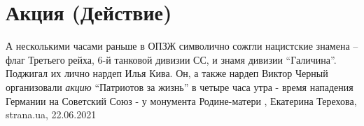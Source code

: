  
 
 
 
 
\chapter{Акция (Действие)}

А несколькими часами раньше в ОПЗЖ символично сожгли нацистские знамена – флаг
Третьего рейха, 6-й танковой дивизии СС, и знамя дивизии \enquote{Галичина}. Поджигал
их лично нардеп Илья Кива.  Он, а также нардеп Виктор Черный организовали \emph{акцию}
\enquote{Патриотов за жизнь} в четыре часа утра - время нападения Германии на Советский
Союз - у монумента Родине-матери
, Екатерина Терехова, strana.ua, 22.06.2021
